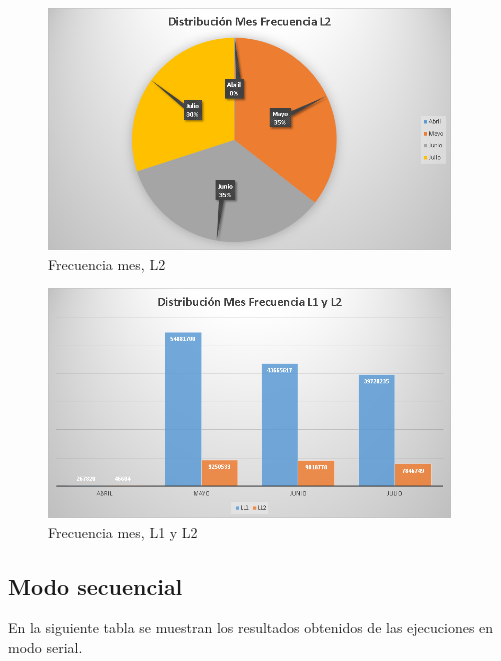 \begin{figure}[H]
\centering
\includegraphics[width=0.95\textwidth]{images/Frecuency_Month_L2}
\caption{Frecuencia mes, L2}
\label{fig:6.6}
\end{figure}

\begin{figure}[H]
\centering
\includegraphics[width=0.95\textwidth]{images/Frecuency_Month_L1_L2}
\caption{Frecuencia mes, L1 y L2}
\label{fig:6.7}
\end{figure}

\subsection{Modo secuencial}
\noindent
En la siguiente tabla se muestran los resultados obtenidos de las ejecuciones en modo serial.

